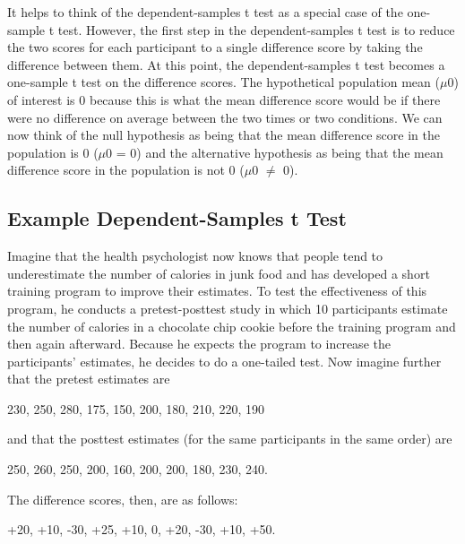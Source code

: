 It helps to think of the dependent-samples t test as a special case of the one-sample t test. However, the first step in the dependent-samples t test is to reduce the two scores for each participant to a single difference score by taking the difference between them. At this point, the dependent-samples t test becomes a one-sample t test on the difference scores. The hypothetical population mean ($\mu$0) of interest is 0 because this is what the mean difference score would be if there were no difference on average between the two times or two conditions. We can now think of the null hypothesis as being that the mean difference score in the population is 0 ($\mu$0 = 0) and the alternative hypothesis as being that the mean difference score in the population is not 0 ($\mu$0 $\neq$ 0).


\subsection{Example Dependent-Samples t Test}

Imagine that the health psychologist now knows that people tend to underestimate the number of calories in junk food and has developed a short training program to improve their estimates. To test the effectiveness of this program, he conducts a pretest-posttest study in which 10 participants estimate the number of calories in a chocolate chip cookie before the training program and then again afterward. Because he expects the program to increase the participants' estimates, he decides to do a one-tailed test. Now imagine further that the pretest estimates are


\begin{kframe}
230, 250, 280, 175, 150, 200, 180, 210, 220, 190

\end{kframe}

and that the posttest estimates (for the same participants in the same order) are


\begin{kframe}
250, 260, 250, 200, 160, 200, 200, 180, 230, 240.

\end{kframe}

The difference scores, then, are as follows:


\begin{kframe}
+20, +10, -30, +25, +10, 0, +20, -30, +10, +50.

\end{kframe}


